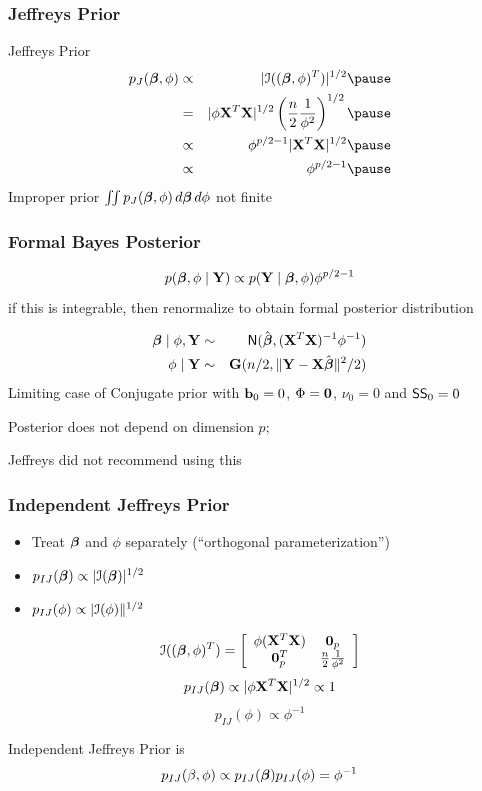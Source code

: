 \documentclass[handout]{beamer}\usepackage[]{graphicx}\usepackage[]{color}
\begin{document}
\begin{frame}
  \frametitle{Jeffreys Prior}
  Jeffreys Prior
  \begin{eqnarray*}
  p_J(\b, \phi)  & \propto & |\cI((\b, \phi)^T) |^{1/2}   \pause \\
               & = & |\phi \X^T\X|^{1/2} \left(\frac{n}{2}
                 \frac{1}{\phi^2} \right)^{1/2} \pause \\
  & \propto  &  \phi^{p/2 - 1} |\X^T\X|^{1/2} \pause \\
  & \propto & \phi^{p/2 - 1}  \pause
  \end{eqnarray*}
  Improper prior   $\iint p_J(\boldsymbol{\beta}, \phi) \, d\boldsymbol{\beta} \, d\phi $ not finite

\end{frame}

\begin{frame}
  \frametitle{Formal Bayes Posterior}
$$  p(\boldsymbol{\beta}, \phi \mid \mathbf{Y}) \propto p(\mathbf{Y} \mid \boldsymbol{\beta}, \phi)  \phi^{p/2 - 1} $$
\pause
if this is integrable, then renormalize to obtain formal posterior
distribution \pause


\begin{eqnarray*}
  \boldsymbol{\beta} \mid \phi, \mathbf{Y} & \sim & \textsf{N}(\hat{\boldsymbol{\beta}}, (\mathbf{X}^T\mathbf{X})^{-1} \phi^{-1}) \\
  \phi \mid \mathbf{Y} & \sim& \mathbf{G}(n/2, \| \mathbf{Y} - \mathbf{X}\hat{\boldsymbol{\beta}} \|^2/2)
\end{eqnarray*} \pause
Limiting case of Conjugate prior with $\mathbf{b}_0 = 0$, $\Phi = \mathbf{0}$,
$\nu_0 = 0$ and $\textsf{SS}_0 = 0$ \pause

Posterior does not depend on dimension $p$;   \pause

\vfill
Jeffreys did not recommend using this
\end{frame}
\begin{frame}
  \frametitle{Independent Jeffreys Prior}
  \begin{itemize}
  \item  Treat $\boldsymbol{\beta}$ and $\phi$ separately  (``orthogonal
    parameterization'') \pause
  \item $p_{IJ}(\boldsymbol{\beta}) \propto |{\cal{I}}(\boldsymbol{\beta})|^{1/2}$ \pause
\item $p_{IJ}(\phi) \propto |{\cal{I}}(\phi)\|^{1/2}$ \pause
  \end{itemize}
$$
{\cal{I}}((\boldsymbol{\beta}, \phi)^T)  =  \left[
  \begin{array}{cc}
    \phi (\mathbf{X}^T\mathbf{X}) & \mathbf{0}_p \\
  \mathbf{0}_p^T & \frac{n}{2} \frac{1}{\phi^2}
  \end{array}
\right]
$$
\pause
$$p_{IJ}(\boldsymbol{\beta}) \propto |\phi \mathbf{X}^T\mathbf{X}|^{1/2} \propto 1$$ \pause
$$p_{IJ}(\phi) \propto \phi^{-1}$$ \pause

Independent Jeffreys Prior is
$$p_{IJ}(\beta, \phi) \propto p_{IJ}(\boldsymbol{\beta}) p_{IJ}(\phi) = \phi^{-1}$$

\end{frame}
\end{document}
